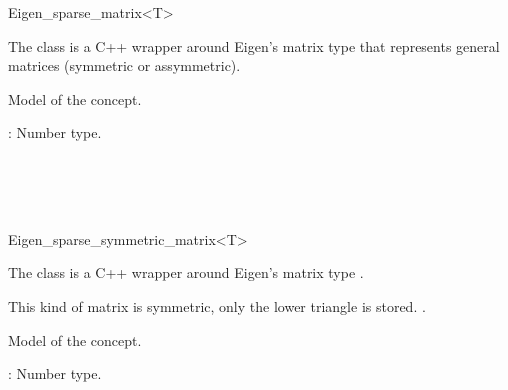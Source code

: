 \ccRefPageBegin
\begin{ccRefClass}{Eigen_sparse_matrix<T>}

\ccDefinition

The class  is a C++ wrapper around Eigen's matrix type 
that represents general matrices (symmetric or assymmetric).


\ccIsModel
Model of the  concept.

\ccParameters
{}: Number type.

\ccSeeAlso

  \\
  \\
  \\

\end{ccRefClass}

\begin{ccRefClass}{Eigen_sparse_symmetric_matrix<T>}

\ccDefinition

The class  is a C++ wrapper around Eigen's matrix type .

This kind of matrix is symmetric, only the lower triangle is stored.
.


\ccIsModel
Model of the  concept.

\ccParameters
{}: Number type.

\ccSeeAlso

  \\
  \\
  \\

\end{ccRefClass}

\ccRefPageEnd
